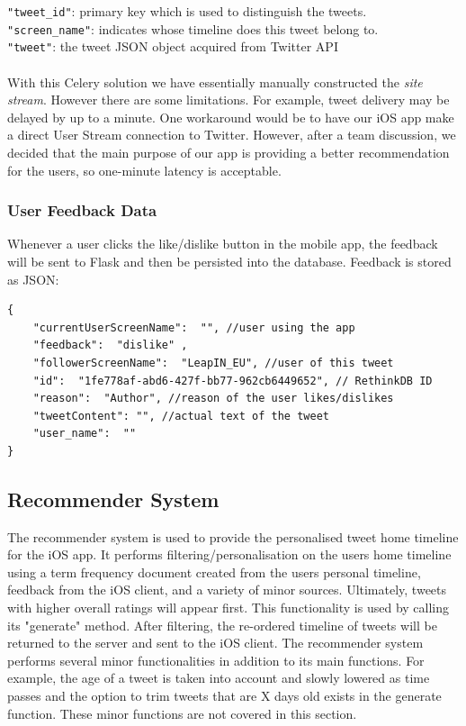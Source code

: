 \documentclass{article}
\begin{document}
\noindent \texttt{"tweet\_id"}: primary key which is used to distinguish the tweets. \\
\texttt{"screen\_name"}: indicates whose timeline does this tweet belong to. \\
\texttt{"tweet"}: the tweet JSON object acquired from Twitter API
\\\\
With this Celery solution we have essentially manually constructed the \textit{site stream}. However there are some limitations. For example, tweet delivery may be delayed by up to a minute. One workaround would be to have our iOS app make a direct User Stream connection to Twitter. However, after a team discussion, we decided that the main purpose of our app is providing a better recommendation for the users, so one-minute latency is acceptable.

\subsubsection*{User Feedback Data} %
Whenever a user clicks the like/dislike button in the mobile app, the feedback will be sent to Flask and then be persisted into the database. Feedback is stored as JSON:

\begin{samepage}
\begin{verbatim}
{
    "currentUserScreenName":  "", //user using the app
    "feedback":  "dislike" ,
    "followerScreenName":  "LeapIN_EU", //user of this tweet
    "id":  "1fe778af-abd6-427f-bb77-962cb6449652", // RethinkDB ID
    "reason":  "Author", //reason of the user likes/dislikes
    "tweetContent": "", //actual text of the tweet
    "user_name":  ""
}
\end{verbatim}
\end{samepage}


\newpage


\subsection{Recommender System} %
The recommender system is used to provide the personalised tweet home timeline for the iOS app. It performs filtering/personalisation on the users home timeline using a term frequency document created from the users personal timeline, feedback from the iOS client, and a variety of minor sources. Ultimately, tweets with higher overall ratings will appear first. This functionality is used by calling its "generate" method. After filtering, the re-ordered timeline of tweets will be returned to the server and sent to the iOS client. The recommender system performs several minor functionalities in addition to its main functions. For example, the age of a tweet is taken into account and slowly lowered as time passes and the option to trim tweets that are X days old exists in the generate function. These minor functions are not covered in this section.
\end{document}
